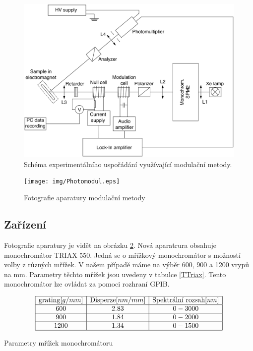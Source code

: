 \begin{figure}
    \begin{center}
    \includegraphics[width=5in]{img/MO_setup.eps}
    \end{center}
    \caption{Schéma experimentálního uspořádání využívající modulační metody.}
    \label{Schema modul}
\end{figure}

\begin{figure}
    \begin{center}
    \texttt{[image: img/Photomodul.eps]}
    \end{center}
    \caption{Fotografie aparatury modulační metody}
    \label{Photo modul}
\end{figure}

\subsection{Zařízení}
Fotografie aparatury je vidět na obrázku \ref{Photo modul}. Nová aparatrura obsahuje monochromátor TRIAX 550. Jedná se o mřížkový monochromátor s možností volby z různých mřížek. V našem případě máme na výběr 600, 900 a 1200 vrypů na mm. Parametry těchto mřížek jsou uvedeny v tabulce \ref{TTriax}. Tento monochromátor lze ovládat za pomoci rozhraní GPIB. 
\begin{table}
$$
\begin{array}{|c|c|c|}
\hline
\mbox{grating} [g/mm]&  \mbox{Disperze} [nm/mm]&    \mbox{Spektrální rozsah} [nm] \\ \hline
600&    2.83&   0 - 3000 \\ \hline
900&    1.84&   0 - 2000 \\ \hline
1200&   1.34&   0 - 1500 \\ \hline
\end{array}
$$
\caption{Parametry mřížek monochromátoru}
\label{TTriax}
\end{table}

